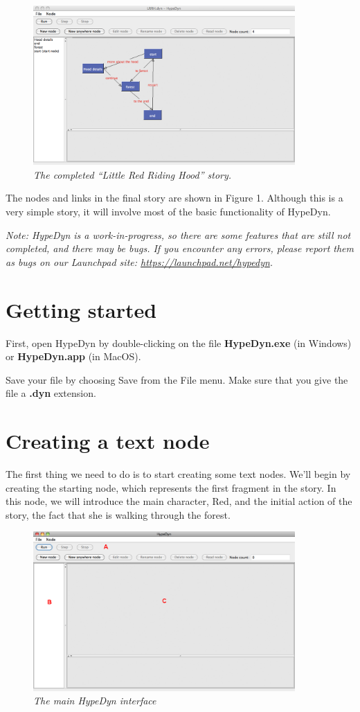\documentclass{article}
\begin{document}
\begin{figure}[ht]
  \centering
  \includegraphics[width=10cm]{images/hypedyn-tutorial-1-figure-1}
  \caption{\textit{The completed ``Little Red Riding Hood'' story.}}
\end{figure} 

The nodes and links in the final story are shown in Figure 1. Although this is
a very simple story, it will involve most of the basic functionality of HypeDyn.

\textit{Note:  HypeDyn is a work-in-progress, so there are some features that are still
not completed, and there may be bugs. If you encounter any errors, please
report them as bugs on our Launchpad site: \url{https://launchpad.net/hypedyn}.}

\section{Getting started}

First, open HypeDyn by double-clicking on the file \textbf{HypeDyn.exe} (in
Windows) or \textbf{HypeDyn.app} (in MacOS).

Save your file by choosing Save from the File menu. Make sure that you give the
file a \textbf{.dyn} extension.

\section{Creating a text node}

The first thing we need to do is to start creating some text nodes. We'll begin
by creating the starting node, which represents the first fragment in the story.
In this node, we will introduce the main character, Red, and the initial action of
the story, the fact that she is walking through the forest.
 
\begin{figure}[ht]
  \centering
  \includegraphics[width=10cm]{images/hypedyn-tutorial-1-figure-2}
  \caption{\textit{The main HypeDyn interface}}
\end{figure} 
\end{document}
